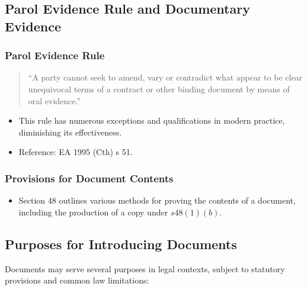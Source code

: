 \subsection{ Parol Evidence Rule and Documentary
Evidence}\label{parol-evidence-rule-and-documentary-evidence}

\subsubsection{Parol Evidence Rule}\label{parol-evidence-rule}

\begin{quote}
``A party cannot seek to amend, vary or contradict what appear to be
clear unequivocal terms of a contract or other binding document by means
of oral evidence.''
\end{quote}

\begin{itemize}
\tightlist
\item
  This rule has numerous exceptions and qualifications in modern
  practice, diminishing its effectiveness.
\item
  Reference: EA 1995 (Cth) s 51.
\end{itemize}

\subsubsection{Provisions for Document
Contents}\label{provisions-for-document-contents}

\begin{itemize}
\tightlist
\item
  Section 48 outlines various methods for proving the contents of a
  document, including the production of a copy under \(s48(1)(b)\).
\end{itemize}

\subsection{  Purposes for Introducing
Documents}\label{purposes-for-introducing-documents}

Documents may serve several purposes in legal contexts, subject to
statutory provisions and common law limitations:

